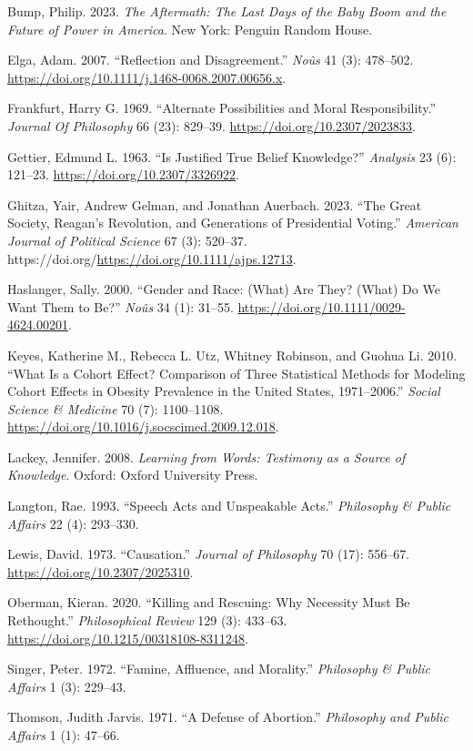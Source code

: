 \documentclass[
  12pt,
  letterpaper,
  DIV=11,
  numbers=noendperiod]{scrartcl}
\newlength{\cslhangindent}
\newenvironment{CSLReferences}[2] %
 {\begin{list}{}{%
  \setlength{\itemindent}{0pt}
  \setlength{\leftmargin}{0pt}
  \setlength{\parsep}{0pt}
  \ifodd #1
   \setlength{\leftmargin}{\cslhangindent}
   \setlength{\itemindent}{-1\cslhangindent}
  \fi
  \setlength{\itemsep}{#2\baselineskip}}}
 {\end{list}}
\begin{document}
\label{refs}
\begin{CSLReferences}{1}{0}
Bump, Philip. 2023. \emph{The Aftermath: The Last Days of the Baby Boom
and the Future of Power in America}. New York: Penguin Random House.

Elga, Adam. 2007. {``Reflection and Disagreement.''} \emph{No{û}s} 41
(3): 478--502. \url{https://doi.org/10.1111/j.1468-0068.2007.00656.x}.

Frankfurt, Harry G. 1969. {``Alternate Possibilities and Moral
Responsibility.''} \emph{Journal Of Philosophy} 66 (23): 829--39.
\url{https://doi.org/10.2307/2023833}.

Gettier, Edmund L. 1963. {``Is Justified True Belief Knowledge?''}
\emph{Analysis} 23 (6): 121--23. \url{https://doi.org/10.2307/3326922}.

Ghitza, Yair, Andrew Gelman, and Jonathan Auerbach. 2023. {``The Great
Society, Reagan's Revolution, and Generations of Presidential Voting.''}
\emph{American Journal of Political Science} 67 (3): 520--37.
https://doi.org/\url{https://doi.org/10.1111/ajps.12713}.

Haslanger, Sally. 2000. {``Gender and Race: (What) Are They? (What) Do
We Want Them to Be?''} \emph{No{û}s} 34 (1): 31--55.
\url{https://doi.org/10.1111/0029-4624.00201}.

Keyes, Katherine M., Rebecca L. Utz, Whitney Robinson, and Guohua Li.
2010. {``What Is a Cohort Effect? Comparison of Three Statistical
Methods for Modeling Cohort Effects in Obesity Prevalence in the United
States, 1971--2006.''} \emph{Social Science \& Medicine} 70 (7):
1100--1108. \url{https://doi.org/10.1016/j.socscimed.2009.12.018}.

Lackey, Jennifer. 2008. \emph{Learning from Words: Testimony as a Source
of Knowledge}. Oxford: Oxford University Press.

Langton, Rae. 1993. {``Speech Acts and Unspeakable Acts.''}
\emph{Philosophy \& Public Affairs} 22 (4): 293--330.

Lewis, David. 1973. {``Causation.''} \emph{Journal of Philosophy} 70
(17): 556--67. \url{https://doi.org/10.2307/2025310}.

Oberman, Kieran. 2020. {``Killing and Rescuing: Why Necessity Must Be
Rethought.''} \emph{Philosophical Review} 129 (3): 433--63.
\url{https://doi.org/10.1215/00318108-8311248}.

Singer, Peter. 1972. {``Famine, Affluence, and Morality.''}
\emph{Philosophy \& Public Affairs} 1 (3): 229--43.

Thomson, Judith Jarvis. 1971. {``A Defense of Abortion.''}
\emph{Philosophy and Public Affairs} 1 (1): 47--66.

\end{CSLReferences}
\end{document}
